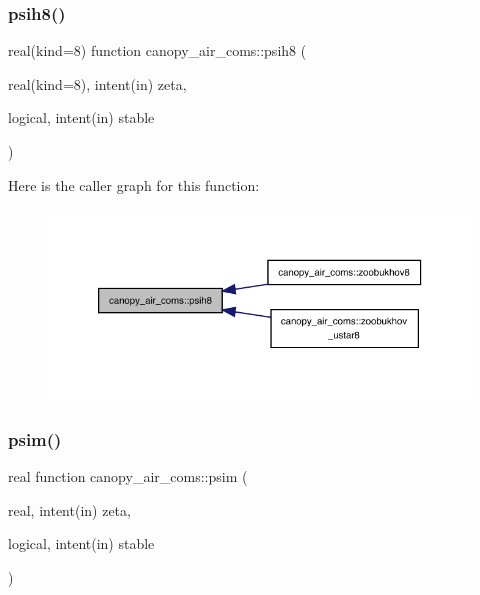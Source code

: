 \subsubsection{\texorpdfstring{psih8()}{psih8()}}
{\footnotesize\ttfamily real(kind=8) function canopy\+\_\+air\+\_\+coms\+::psih8 (\begin{DoxyParamCaption}\item[{real(kind=8), intent(in)}]{zeta,  }\item[{logical, intent(in)}]{stable }\end{DoxyParamCaption})}

Here is the caller graph for this function\+:
\nopagebreak
\begin{figure}[H]
\begin{center}
\leavevmode
\includegraphics[width=333pt]{namespacecanopy__air__coms_aef33f0eeea82151a8edb6dc38c4cc921_icgraph}
\end{center}
\end{figure}
\mbox{\label{namespacecanopy__air__coms_ab103fa081460babbe04c9a5a4699be5f}} 
\subsubsection{\texorpdfstring{psim()}{psim()}}
{\footnotesize\ttfamily real function canopy\+\_\+air\+\_\+coms\+::psim (\begin{DoxyParamCaption}\item[{real, intent(in)}]{zeta,  }\item[{logical, intent(in)}]{stable }\end{DoxyParamCaption})}

